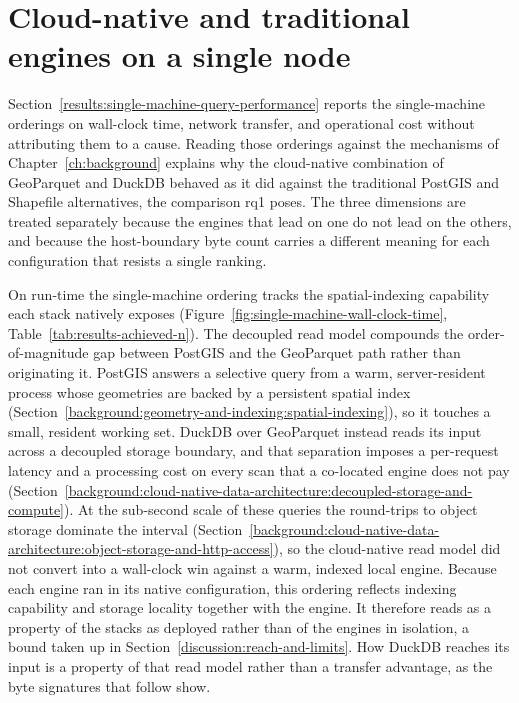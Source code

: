 \section{Cloud-native and traditional engines on a single node}
\label{discussion:single-node-cloud-native-vs-traditional}

Section~\ref{results:single-machine-query-performance} reports the single-machine orderings on wall-clock time, network transfer, and operational cost without attributing them to a cause. Reading those orderings against the mechanisms of Chapter~\ref{ch:background} explains why the cloud-native combination of GeoParquet and DuckDB behaved as it did against the traditional PostGIS and Shapefile alternatives, the comparison \acrshort{rq}1 poses. The three dimensions are treated separately because the engines that lead on one do not lead on the others, and because the host-boundary byte count carries a different meaning for each configuration that resists a single ranking.

On run-time the single-machine ordering tracks the spatial-indexing capability each stack natively exposes (Figure~\ref{fig:single-machine-wall-clock-time}, Table~\ref{tab:results-achieved-n}). The decoupled read model compounds the order-of-magnitude gap between PostGIS and the GeoParquet path rather than originating it. PostGIS answers a selective query from a warm, server-resident process whose geometries are backed by a persistent spatial index (Section~\ref{background:geometry-and-indexing:spatial-indexing}), so it touches a small, resident working set. DuckDB over GeoParquet instead reads its input across a decoupled storage boundary, and that separation imposes a per-request latency and a processing cost on every scan that a co-located engine does not pay \parencite{dageville2016_snowflake_elastic_data_warehouse,pang2024_storage_disaggregated_databases} (Section~\ref{background:cloud-native-data-architecture:decoupled-storage-and-compute}). At the sub-second scale of these queries the round-trips to object storage dominate the interval \parencite{fielding2022_rfc9110_http_semantics} (Section~\ref{background:cloud-native-data-architecture:object-storage-and-http-access}), so the cloud-native read model did not convert into a wall-clock win against a warm, indexed local engine. Because each engine ran in its native configuration, this ordering reflects indexing capability and storage locality together with the engine. It therefore reads as a property of the stacks as deployed rather than of the engines in isolation, a bound taken up in Section~\ref{discussion:reach-and-limits}. How DuckDB reaches its input is a property of that read model rather than a transfer advantage, as the byte signatures that follow show.


